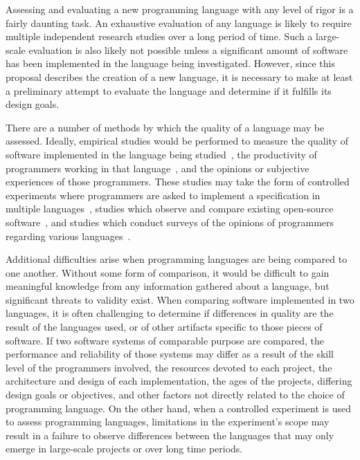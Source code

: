 \documentclass[11pt,a4paper]{article}
\theoremstyle{break}
\begin{document}
Assessing and evaluating a new programming language with any level of rigor is a fairly daunting task. An exhaustive evaluation of any language is likely to require multiple independent research studies over a long period of time. Such a large-scale evaluation is also likely not possible unless a significant amount of software has been implemented in the language being investigated. However, since this proposal describes the creation of a new language, it is necessary to make at least a preliminary attempt to evaluate the language and determine if it fulfills its design goals.

There are a number of methods by which the quality of a language may be assessed. Ideally, empirical studies would be performed to measure the quality of software implemented in the language being studied~\cite{Bhattacharya:2011:APL:1985793.1985817,Ray:2014:LSS:2635868.2635922}, the productivity of programmers working in that language~\cite{hudak1994haskell}, and the opinions or subjective experiences of those programmers. These studies may take the form of controlled experiments where programmers are asked to implement a specification in multiple languages~\cite{hudak1994haskell,Ray:2014:LSS:2635868.2635922}, studies which observe and compare existing open-source software~\cite{Ray:2014:LSS:2635868.2635922,Bhattacharya:2011:APL:1985793.1985817}, and studies which conduct surveys of the opinions of programmers regarding various languages~\cite{Ray:2014:LSS:2635868.2635922}.

Additional difficulties arise when programming languages are being compared to one another. Without some form of comparison, it would be difficult to gain meaningful knowledge from any information gathered about a language, but significant threats to validity exist. When comparing software implemented in two languages, it is often challenging to determine if differences in quality are the result of the languages used, or of other artifacts specific to those pieces of software. If two software systems of comparable purpose are compared, the performance and reliability of those systems may differ as a result of the skill level of the programmers involved, the resources devoted to each project, the architecture and design of each implementation, the ages of the projects, differing design goals or objectives, and other factors not directly related to the choice of programming language. On the other hand, when a controlled experiment is used to assess programming languages, limitations in the experiment's scope may result in a failure to observe differences between the languages that may only emerge in large-scale projects or over long time periods.
\end{document}
